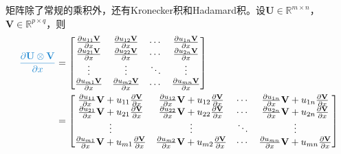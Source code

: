 \documentclass{ctexart}
\newcommand{\blue}[1]{\textcolor{Solarized-blue}{#1}}
\theoremstyle{definition}
\def \Uv {\mathbf{U}}
\def \Vv {\mathbf{V}}
\def \Rbb {\mathbb{R}}
\begin{document}
矩阵除了常规的乘积外，还有Kronecker积和Hadamard积。设$\Uv \in \Rbb^{m \times n}$，$\Vv \in \Rbb^{p \times q}$，则
\begin{align*}
    \blue{\frac{\partial \Uv \otimes \Vv}{\partial x}} & = \begin{bmatrix}
        \frac{\partial u_{11} \Vv}{\partial x} & \frac{\partial u_{12} \Vv}{\partial x} & \cdots & \frac{\partial u_{1n} \Vv}{\partial x} \\
        \frac{\partial u_{21} \Vv}{\partial x} & \frac{\partial u_{22} \Vv}{\partial x} & \cdots & \frac{\partial u_{2n} \Vv}{\partial x} \\
        \vdots                                 & \vdots                                 & \ddots & \vdots                                 \\
        \frac{\partial u_{m1} \Vv}{\partial x} & \frac{\partial u_{m2} \Vv}{\partial x} & \cdots & \frac{\partial u_{mn} \Vv}{\partial x} \\
    \end{bmatrix}                                                                       \\
                                                       & = \begin{bmatrix}
        \frac{\partial u_{11}}{\partial x} \Vv + u_{11} \frac{\partial \Vv}{\partial x} & \frac{\partial u_{12}}{\partial x} \Vv + u_{12} \frac{\partial \Vv}{\partial x} & \cdots & \frac{\partial u_{1n}}{\partial x} \Vv + u_{1n} \frac{\partial \Vv}{\partial x} \\
        \frac{\partial u_{21}}{\partial x} \Vv + u_{21} \frac{\partial \Vv}{\partial x} & \frac{\partial u_{22}}{\partial x} \Vv + u_{22} \frac{\partial \Vv}{\partial x} & \cdots & \frac{\partial u_{2n}}{\partial x} \Vv + u_{2n} \frac{\partial \Vv}{\partial x} \\
        \vdots                                                                          & \vdots                                                                          & \ddots & \vdots                                                                          \\
        \frac{\partial u_{m1}}{\partial x} \Vv + u_{m1} \frac{\partial \Vv}{\partial x} & \frac{\partial u_{m2}}{\partial x} \Vv + u_{m2} \frac{\partial \Vv}{\partial x} & \cdots & \frac{\partial u_{mn}}{\partial x} \Vv + u_{mn} \frac{\partial \Vv}{\partial x} \\
    \end{bmatrix}                                                                       \\

\end{align*}
\end{document}
